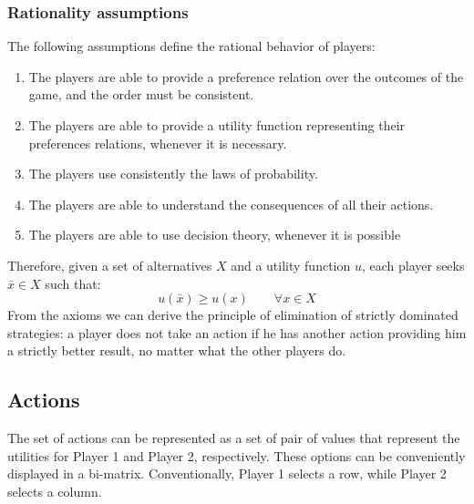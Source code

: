 \subsubsection{Rationality assumptions}
The following assumptions define the rational behavior of players:
\begin{enumerate}
    \item The players are able to provide a preference relation over the outcomes of the game, and the order must be consistent. 
    \item The players are able to provide a utility function representing their preferences relations, whenever it is necessary. 
    \item The players use consistently the laws of probability. 
    \item The players are able to understand the consequences of all their actions. 
    \item The players are able to use decision theory, whenever it is possible
\end{enumerate}
\noindent Therefore, given a set of alternatives $X$ and a utility function $u$, each player seeks $\bar{x}\in X$ such that: 
\[u(\bar{x}) \geq u(x)\qquad\forall x \in X\]
From the axioms we can derive the principle of elimination of strictly dominated strategies: a player does not take an action if he has another action providing him a strictly better result, no matter what the other players do. 

\subsection{Actions}
The set of actions can be represented as a set of pair of values that represent the utilities for Player 1 and Player 2, respectively. 
These options can be conveniently displayed in a bi-matrix.
Conventionally, Player 1 selects a row, while Player 2 selects a column. 